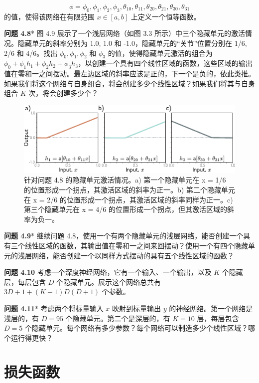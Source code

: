\documentclass[lang=cn,newtx,10pt,scheme=chinese]{elegantbook}
\begin{document}
\begin{equation*}
\phi = {\phi_0, \phi_1, \phi_2, \phi_3, \theta_{10}, \theta_{11}, \theta_{20}, \theta_{21}, \theta_{30}, \theta_{31}}
\end{equation*}
的值，使得该网络在有限范围 \(x \in [a, b]\) 上定义一个恒等函数。

\textbf{问题 4.8}* 图 4.9 展示了一个浅层网络（如图 3.3 所示）中三个隐藏单元的激活情况。隐藏单元的斜率分别为 1.0, 1.0 和 -1.0，隐藏单元的“关节”位置分别在 1/6, 2/6 和 4/6。找出 \(\phi_0, \phi_1, \phi_2\) 和 \(\phi_3\) 的值，使得隐藏单元激活的组合为 \(\phi_0 + \phi_1 h_1 + \phi_2 h_2 + \phi_3 h_3\)，以创建一个具有四个线性区域的函数，这些区域的输出值在零和一之间摆动。最左边区域的斜率应该是正的，下一个是负的，依此类推。如果我们将这个网络与自身组合，将会创建多少个线性区域？如果我们将其与自身组合 \(K\) 次，将会创建多少个？

\begin{figure}[ht!]
	\centering
	\includegraphics[width=0.7\linewidth]{PDFFigures/UDLChap4PDF/DeepProbZeroCross.pdf}
	\caption{针对问题 4.8 的隐藏单元激活情况。a) 第一个隐藏单元在 x = 1/6 的位置形成一个拐点，其激活区域的斜率为正一。b) 第二个隐藏单元在 x = 2/6 的位置形成一个拐点，其激活区域的斜率同样为正一。c) 第三个隐藏单元在 x = 4/6 的位置形成一个拐点，但其激活区域的斜率为负一。}
\end{figure}


\textbf{问题 4.9}* 继续问题 4.8，使用一个有两个隐藏单元的浅层网络，能否创建一个具有三个线性区域的函数，其输出值在零和一之间来回摆动？使用一个有四个隐藏单元的浅层网络，能否创建一个以同样方式摆动的具有五个线性区域的函数？

\textbf{问题 4.10} 考虑一个深度神经网络，它有一个输入、一个输出，以及 \(K\) 个隐藏层，每层包含 \(D\) 个隐藏单元。展示这个网络总共有 \(3D + 1 + (K - 1)D(D + 1)\) 个参数。

\textbf{问题 4.11}* 考虑两个将标量输入 \(x\) 映射到标量输出 \(y\) 的神经网络。第一个网络是浅层的，有 \(D = 95\) 个隐藏单元。第二个是深层的，有 \(K = 10\) 层，每层包含 \(D = 5\) 个隐藏单元。每个网络有多少参数？每个网络可以制造多少个线性区域？哪个运行得更快？


\chapter{损失函数}
\end{document}
